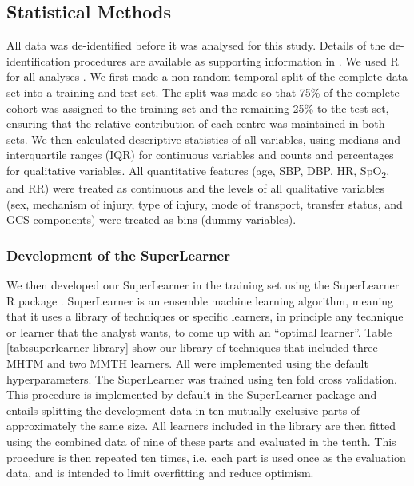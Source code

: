 \documentclass[10pt,letterpaper]{article}\usepackage[]{graphicx}\usepackage[]{color}
\begin{document}
\subsection*{Statistical Methods}
All data was de-identified before it was analysed for this study. Details of the
de-identification procedures are available as supporting information in
. We used R for all analyses \cite{R}. We first made a
non-random temporal split of the complete data set into a training and test
set. The split was made so that 75\% of the complete cohort was assigned to the
training set and the remaining 25\% to the test set, ensuring that the relative
contribution of each centre was maintained in both sets. We then calculated
descriptive statistics of all variables, using medians and interquartile ranges
(IQR) for continuous variables and counts and percentages for qualitative
variables. All quantitative features (age, SBP, DBP, HR, SpO\textsubscript{2},
and RR) were treated as continuous and the levels of all qualitative variables
(sex, mechanism of injury, type of injury, mode of transport, transfer status,
and GCS components) were treated as bins (dummy variables).

\subsubsection*{Development of the SuperLearner}
We then developed our SuperLearner in the training set using the SuperLearner R
package \cite{SuperLearner}. SuperLearner is an ensemble machine learning
algorithm, meaning that it uses a library of techniques or specific learners, in
principle any technique or learner that the analyst wants, to come up with an
``optimal learner''. Table \ref{tab:superlearner-library} show our library of
techniques that included three MHTM and two MMTH learners. All were implemented
using the default hyperparameters. The SuperLearner was trained using ten fold
cross validation. This procedure is implemented by default in the SuperLearner
package and entails splitting the development data in ten mutually exclusive
parts of approximately the same size. All learners included in the library are
then fitted using the combined data of nine of these parts and evaluated in the
tenth. This procedure is then repeated ten times, i.e. each part is used once as
the evaluation data, and is intended to limit overfitting and reduce optimism.
\end{document}
